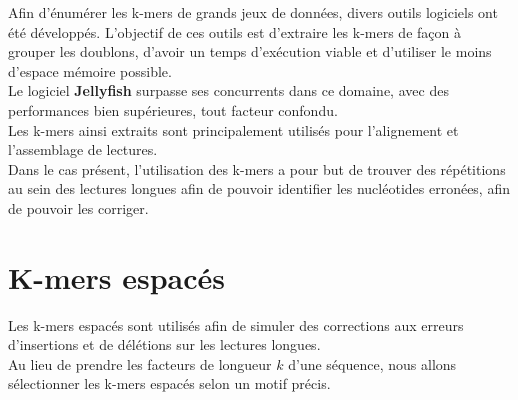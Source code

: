 \documentclass{report}
\begin{document}
      Afin d'énumérer les k-mers de grands jeux de données, divers outils logiciels ont été développés. L'objectif de ces outils est d'extraire les k-mers de façon à grouper les doublons, d'avoir un temps d'exécution viable et d'utiliser le moins d'espace mémoire possible.\\

      Le logiciel \textbf{Jellyfish} \cite{Marcais2011} surpasse ses concurrents dans ce domaine, avec des performances bien supérieures, tout facteur confondu.\\

      Les k-mers ainsi extraits sont principalement utilisés pour l'alignement et l'assemblage de lectures.\\

      Dans le cas présent, l'utilisation des k-mers a pour but de trouver des répétitions au sein des lectures longues afin de pouvoir identifier les nucléotides erronées, afin de pouvoir les corriger.
    \section{K-mers espacés}
      Les k-mers espacés sont utilisés afin de simuler des corrections aux erreurs d'insertions et de délétions sur les lectures longues.\\
      Au lieu de prendre les facteurs de longueur $k$ d'une séquence, nous allons sélectionner les k-mers espacés selon un motif précis.\\
\end{document}
